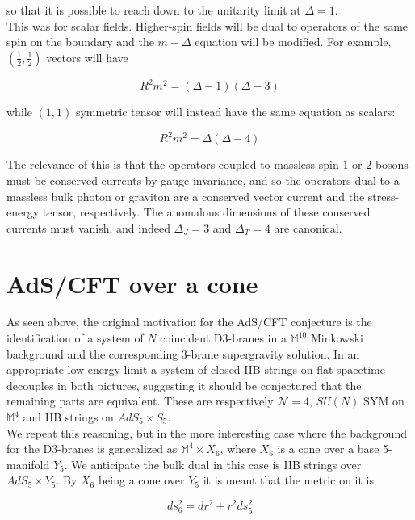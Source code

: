 so that it is possible to reach down to the unitarity limit at $\Delta = 1$.\\

This was for scalar fields. Higher-spin fields will be dual to operators of the same spin on the boundary and the $m-\Delta$ equation will be modified. For example, $(\frac{1}{2},\frac{1}{2})$ vectors will have

\begin{equation}
	R^2 m^2 = (\Delta-1)(\Delta-3)
	\label{}
\end{equation}

while $(1,1)$ symmetric tensor will instead have the same equation as scalars:

\begin{equation}
	R^2 m^2 = \Delta (\Delta-4)
	\label{}
\end{equation}

The relevance of this is that the operators coupled to massless spin $1$ or $2$ bosons must be conserved currents by gauge invariance, and so the operators dual to a massless bulk photon or graviton are a conserved vector current and the stress-energy tensor, respectively. The anomalous dimensions of these conserved currents must vanish, and indeed $\Delta_J = 3$ and $\Delta_T = 4$ are canonical.

\section{AdS/CFT over a cone}

As seen above, the original motivation for the AdS/CFT conjecture is the identification of a system of $N$ coincident D3-branes in a $\mathbb{M}^{10}$ Minkowski background and the corresponding 3-brane supergravity solution. In an appropriate low-energy limit a system of closed IIB strings on flat spacetime decouples in both pictures, suggesting it should be conjectured that the remaining parts are equivalent. These are respectively $\mathcal{N}=4$, $SU(N)$ SYM on $\mathbb{M}^4$ and IIB strings on $AdS_5 \times S_5$.\\

We repeat this reasoning, but in the more interesting case where the background for the D3-branes is generalized as $\mathbb{M}^4 \times X_6$, where $X_6$ is a cone over a base 5-manifold $Y_5$. We anticipate the bulk dual in this case is IIB strings over $AdS_5 \times Y_5$. By $X_6$ being a cone over $Y_5$ it is meant that the metric on it is

\begin{equation}
	ds^2_6 = dr^2 + r^2 ds_5^2 \label{conemetric}
\end{equation}

